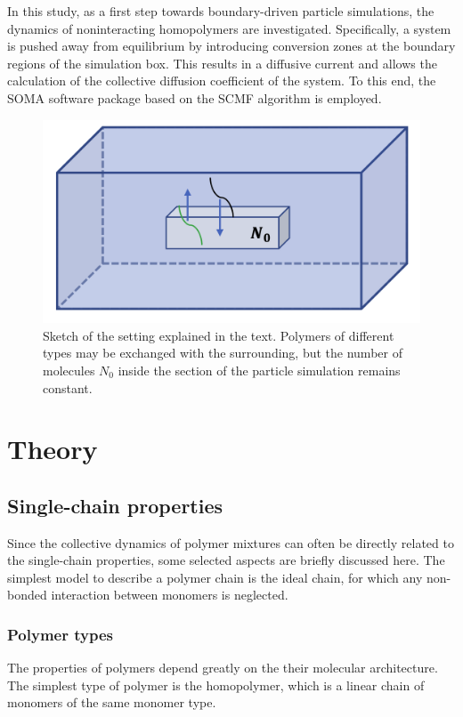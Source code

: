 \documentclass[bachelor,       %
               oneside,        %
               BCOR10mm,       %
               ngerman, english %
               ]{GAUBM}
\begin{document}
In this study, as a first step towards boundary-driven particle simulations, the dynamics of noninteracting homopolymers are investigated. Specifically, a system is pushed away from equilibrium by introducing conversion zones at the boundary regions of the simulation box. This results in a diffusive current and allows the calculation of the collective diffusion coefficient of the system. To this end, the \ac{SOMA} \cite{Schneider_soma} software package based on the \ac{SCMF} algorithm \cite{Daoulas06} is employed.
\begin{figure}[h]
  \centering
  \includegraphics[width=0.5\linewidth]{figures/continuum_section.png}
  \caption{Sketch of the setting explained in the text. Polymers of different types may be exchanged with the surrounding, but the number of molecules $N_0$ inside the section of the particle simulation remains constant.}
  \label{fig:continuum_section}
\end{figure}



\chapter{Theory}

\section{Single-chain properties}

Since the collective dynamics of polymer mixtures can often be directly related to the single-chain properties, some selected aspects are briefly discussed here. The simplest model to describe a polymer chain is the ideal chain, for which any non-bonded interaction between monomers is neglected.

\subsection{Polymer types}

The properties of polymers depend greatly on the their molecular architecture. The simplest type of polymer is the homopolymer, which is a linear chain of monomers of the same monomer type. 
\end{document}
